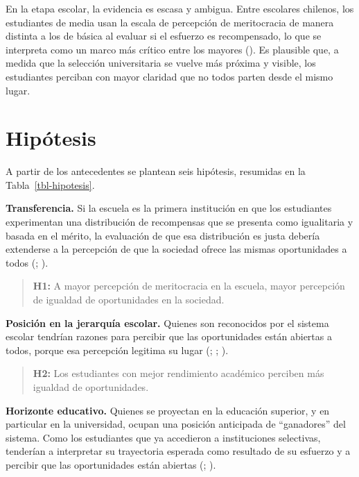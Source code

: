 \documentclass[
  spanish,
  a4paper,
  oneside]{scrbook}
\begin{document}
En la etapa escolar, la evidencia es escasa y ambigua. Entre escolares
chilenos, los estudiantes de media usan la escala de percepción de
meritocracia de manera distinta a los de básica al evaluar si el
esfuerzo es recompensado, lo que se interpreta como un marco más crítico
entre los mayores (). Es plausible que, a medida que la selección universitaria se
vuelve más próxima y visible, los estudiantes perciban con mayor
claridad que no todos parten desde el mismo lugar.

\section{Hipótesis}\label{hipuxf3tesis}

A partir de los antecedentes se plantean seis hipótesis, resumidas en la
Tabla~\ref{tbl-hipotesis}.

\textbf{Transferencia.} Si la escuela es la primera institución en que
los estudiantes experimentan una distribución de recompensas que se
presenta como igualitaria y basada en el mérito, la evaluación de que
esa distribución es justa debería extenderse a la percepción de que la
sociedad ofrece las mismas oportunidades a todos
(;
).

\begin{quote}
\textbf{H1:} A mayor percepción de meritocracia en la escuela, mayor
percepción de igualdad de oportunidades en la sociedad.
\end{quote}

\textbf{Posición en la jerarquía escolar.} Quienes son reconocidos por
el sistema escolar tendrían razones para percibir que las oportunidades
están abiertas a todos, porque esa percepción legitima su lugar
(;
;
).

\begin{quote}
\textbf{H2:} Los estudiantes con mejor rendimiento académico perciben
más igualdad de oportunidades.
\end{quote}

\textbf{Horizonte educativo.} Quienes se proyectan en la educación
superior, y en particular en la universidad, ocupan una posición
anticipada de ``ganadores'' del sistema. Como los estudiantes que ya
accedieron a instituciones selectivas, tenderían a interpretar su
trayectoria esperada como resultado de su esfuerzo y a percibir que las
oportunidades están abiertas
(;
).
\end{document}
